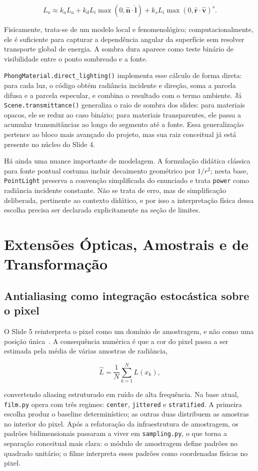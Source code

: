 \documentclass[portuguese]{sbcreviews-2025}%
\makeatletter
\newcommand{\slideurl}[1]{%
    \ifcsname slideurl@#1\endcsname
        \csname slideurl@#1\endcsname
    \else
        #1
    \fi
}
\newcommand{\slidescite}[2]{\citep[\href{\slideurl{#1}}{pp.~#2}]{#1}}
\makeatother
\begin{document}
\[
L_o \approx k_a L_a + k_d L_i\max(0,\hat{\mathbf{n}}\cdot\hat{\mathbf{l}})
+ k_s L_i\max(0,\hat{\mathbf{r}}\cdot\hat{\mathbf{v}})^s.
\]

Fisicamente, trata-se de um modelo local e fenomenológico; computacionalmente, ele é suficiente para capturar a dependência angular da superfície sem resolver transporte global de energia. A sombra dura aparece como teste binário de visibilidade entre o ponto sombreado e a fonte.

\texttt{PhongMaterial.direct\_lighting()} implementa esse cálculo de forma direta: para cada luz, o código obtém radiância incidente e direção, soma a parcela difusa e a parcela especular, e combina o resultado com o termo ambiente. Já \texttt{Scene.transmittance()} generaliza o raio de sombra dos slides: para materiais opacos, ele se reduz ao caso binário; para materiais transparentes, ele passa a acumular transmitâncias ao longo do segmento até a fonte. Essa generalização pertence ao bloco mais avançado do projeto, mas sua raiz conceitual já está presente no núcleo do Slide 4.

Há ainda uma nuance importante de modelagem. A formulação didática clássica para fonte pontual costuma incluir decaimento geométrico por \(1/r^2\); nesta base, \texttt{PointLight} preserva a convenção simplificada do enunciado e trata \texttt{power} como radiância incidente constante. Não se trata de erro, mas de simplificação deliberada, pertinente ao contexto didático, e por isso a interpretação física dessa escolha precisa ser declarada explicitamente na seção de limites.

\section{Extensões Ópticas, Amostrais e de Transformação}
\label{sec:extensoes-v3}

\subsection{Antialiasing como integração estocástica sobre o pixel}
\label{sec:aa-v3}

O Slide 5 reinterpreta o pixel como um domínio de amostragem, e não como uma posição única~\slidescite{inf2608slides05}{4--8}. A consequência numérica é que a cor do pixel passa a ser estimada pela média de várias amostras de radiância,

\[
\hat L = \frac{1}{N}\sum_{k=1}^{N} L(x_k),
\]

convertendo aliasing estruturado em ruído de alta frequência. Na base atual, \texttt{film.py} opera com três regimes: \texttt{center}, \texttt{jittered} e \texttt{stratified}. A primeira escolha produz o baseline determinístico; as outras duas distribuem as amostras no interior do pixel. Após a refatoração da infraestrutura de amostragem, os padrões bidimensionais passaram a viver em \texttt{sampling.py}, o que torna a separação conceitual mais clara: o módulo de amostragem define padrões no quadrado unitário; o filme interpreta esses padrões como coordenadas físicas no pixel.
\end{document}
